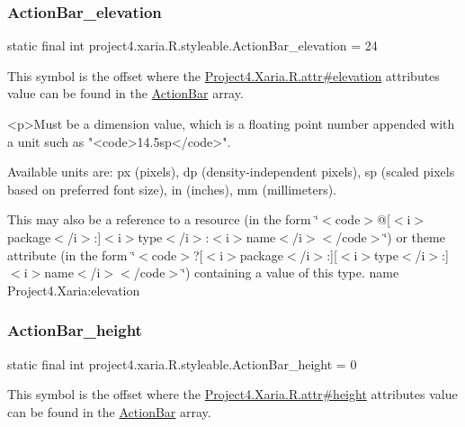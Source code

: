 \subsubsection{\texorpdfstring{Action\+Bar\+\_\+elevation}{ActionBar\_elevation}}
{\footnotesize\ttfamily static final int project4.\+xaria.\+R.\+styleable.\+Action\+Bar\+\_\+elevation = 24\hspace{0.3cm}{\ttfamily [static]}}

This symbol is the offset where the \hyperlink{}{Project4.\+Xaria.\+R.\+attr\#elevation} attribute\textquotesingle{}s value can be found in the \hyperlink{classproject4_1_1xaria_1_1R_1_1styleable_accb530194c58ee3abb15587da8869e99}{Action\+Bar} array.

\begin{DoxyVerb}      <p>Must be a dimension value, which is a floating point number appended with a unit such as "<code>14.5sp</code>".
\end{DoxyVerb}
 Available units are\+: px (pixels), dp (density-\/independent pixels), sp (scaled pixels based on preferred font size), in (inches), mm (millimeters). 

This may also be a reference to a resource (in the form \char`\"{}$<$code$>$@\mbox{[}$<$i$>$package$<$/i$>$\+:\mbox{]}$<$i$>$type$<$/i$>$\+:$<$i$>$name$<$/i$>$$<$/code$>$\char`\"{}) or theme attribute (in the form \char`\"{}$<$code$>$?\mbox{[}$<$i$>$package$<$/i$>$\+:\mbox{]}\mbox{[}$<$i$>$type$<$/i$>$\+:\mbox{]}$<$i$>$name$<$/i$>$$<$/code$>$\char`\"{}) containing a value of this type.  name Project4.\+Xaria\+:elevation \mbox{\label{classproject4_1_1xaria_1_1R_1_1styleable_acac776d934e00d7cc5f0250a0d027a24}} 
\subsubsection{\texorpdfstring{Action\+Bar\+\_\+height}{ActionBar\_height}}
{\footnotesize\ttfamily static final int project4.\+xaria.\+R.\+styleable.\+Action\+Bar\+\_\+height = 0\hspace{0.3cm}{\ttfamily [static]}}

This symbol is the offset where the \hyperlink{}{Project4.\+Xaria.\+R.\+attr\#height} attribute\textquotesingle{}s value can be found in the \hyperlink{classproject4_1_1xaria_1_1R_1_1styleable_accb530194c58ee3abb15587da8869e99}{Action\+Bar} array.

